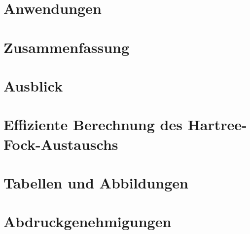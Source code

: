 \documentclass[
  paper=A4, 		%
  pagesize, 		%
  DIV=12, 		%
  ngerman,  		%
  12pt, 			%
  listof=totocnumbered, 
  bibliography=totoc, 
  index=totoc, 
  openany, 
]{scrbook}
\begin{document}
\chapter{Anwendungen}\label{anwendungen}


\chapter{Zusammenfassung}\label{zusammenfassung}

\chapter{Ausblick}\label{ausblick}

\appendix
\setcounter{figure}{0}
\renewcommand{\thefigure}{A\arabic{figure}}
\chapter{Effiziente Berechnung des Hartree-Fock-Austauschs}\label{hfaustausch}

\chapter{Tabellen und Abbildungen}\label{anhang}

\chapter{Abdruckgenehmigungen}


\begingroup
	\renewcommand{\addvspace}[1]{}
	\listoffigures
\endgroup

\begingroup
	\renewcommand{\addvspace}[1]{}
{
\makeatletter
\renewcommand*\l@table{\@dottedtocline{1}{1.5em}{2.7em}}
\makeatother
\listoftables
}
\endgroup
\vfill
\newpage
\thispagestyle{empty}
\cleardoublepage

\printglossary[type=\acronymtype,style=long]
%
\backmatter
\printbibliography[title=Literaturverzeichnis]
\vfill
\newpage
\thispagestyle{empty}
\cleardoublepage
\end{document}
